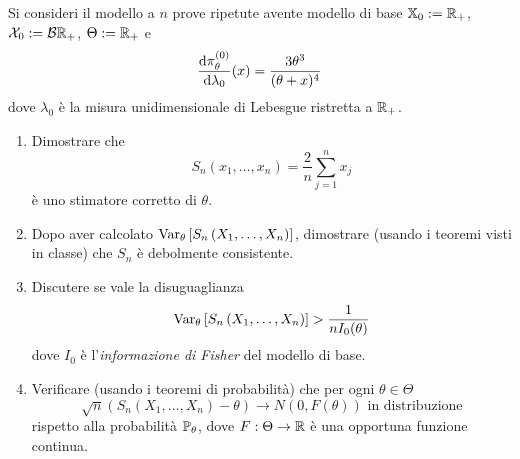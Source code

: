 \begin{esercizio}[Problema 3, 12/09/2024]
  Si consideri il modello a \(n\) prove ripetute avente modello di base \(\mathbb X_0 := \mathbb R_+\), \(\mathcal X_0 := \mathcal B \mathbb R_+\), $\Theta := \mathbb R_+$ e
  \[
    \frac{\mathrm d \pi_{\theta}^{(0)}}{\mathrm d \lambda_0}(x) = \frac{3\theta^3}{(\theta + x)^4}
  \]
  dove $\lambda_0$ è la misura unidimensionale di Lebesgue ristretta a $\mathbb R_+$.
  \begin{enumerate}[leftmargin=*]
  \item Dimostrare che
    \[
      S_n (x_1, \dots, x_n) = \frac 2 n \sum_{j=1}^{n}x_j
    \]
    è uno stimatore corretto di \(\theta\).

    
  \item Dopo aver calcolato \(\operatorname{Var}_\theta \left[ S_n\left( X_1, \dots, X_n \right) \right]\), dimostrare (usando i teoremi visti in classe) che \(S_n\) è debolmente consistente.
    
  \item Discutere se vale la disuguaglianza
    \[
      \operatorname{Var}_\theta \left[ S_n\left( X_1, \dots, X_n \right) \right] > \frac{1}{n I_0(\theta)}
    \]
    dove \(I_0\) è l'{\em informazione di Fisher} del modello di base.
    
  \item Verificare (usando i teoremi di probabilità) che per ogni \(\theta \in \Theta\)
    \[
      \sqrt{n} \left( S_n\left( X_1, \dots, X_n \right) - \theta \right) \to N(0, F(\theta)) \text{ in distribuzione}
    \]
    rispetto alla probabilità \(\mathbb P_\theta\), dove \(F : \Theta \to \mathbb R\) è una opportuna funzione continua.
  \end{enumerate}
\end{esercizio}

